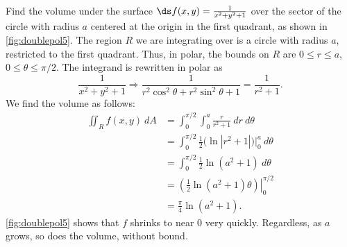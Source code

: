 \begin{example}\label{ex_doublepol5}
Find the volume under the surface $\ds f(x,y) =\frac1{x^2+y^2+1}$ over the  sector of the circle with radius $a$ centered at the origin in the first quadrant, as shown in \autoref{fig:doublepol5}.
\solution
{}
%
The region $R$ we are integrating over is a circle with radius $a$, restricted to the first quadrant. Thus, in polar, the bounds on $R$ are $0\leq r\leq a$, $0\leq\theta\leq\pi/2$. The integrand is rewritten in polar as 
\[
\frac{1}{x^2+y^2+1} \Rightarrow
\frac{1}{r^2\cos^2\theta+r^2\sin^2\theta+1} = \frac1{r^2+1}.
\]
We find the volume as follows:
\begin{align*}
\iint_Rf(x,y)\ dA &= \int_0^{\pi/2}\int_0^a\frac{r}{r^2+1}\ dr\ d\theta\\
		&= \int_0^{\pi/2} \frac12\bigl(\ln|r^2+1|\bigr)\Big|_0^a\ d\theta\\
		&=\int_0^{\pi/2} \frac12\ln(a^2+1)\ d\theta\\
		&= \left.\left(\frac12\ln(a^2+1)\theta\right)\right|_0^{\pi/2}\\
		&= \frac{\pi}{4}\ln(a^2+1).
\end{align*}
\autoref{fig:doublepol5}  shows that $f$ shrinks to near 0 very quickly. Regardless, as $a$ grows, so does the volume, without bound. 
\end{example}

